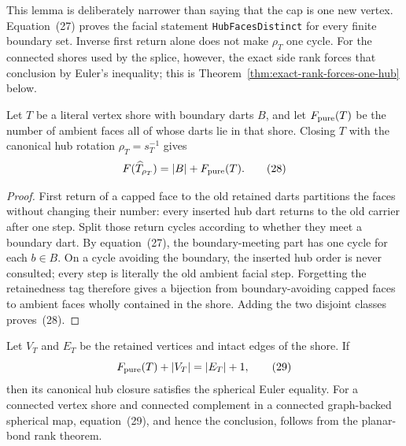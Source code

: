 This lemma is deliberately narrower than saying that the cap is one new
vertex.  Equation~(27) proves the facial statement
\texttt{HubFacesDistinct} for every finite boundary set.  Inverse first
return alone does not make \(\rho_T\) one cycle.  For the connected shores
used by the splice, however, the exact side rank forces that conclusion by
Euler's inequality; this is Theorem~\ref{thm:exact-rank-forces-one-hub} below.

\begin{theorem}
\label{thm:canonical-hub-face-count}
Let \(T\) be a literal vertex shore with boundary darts \(B\), and let
\(F_{\rm pure}(T)\) be the number of ambient faces all of whose darts lie in
that shore.  Closing \(T\) with the canonical hub rotation
\(\rho_T=s_T^{-1}\) gives
\[
       F(\widehat T_{\rho_T})=|B|+F_{\rm pure}(T).       \tag{28}
\]
\end{theorem}

\begin{proof}
First return of a capped face to the old retained darts partitions the faces
without changing their number: every inserted hub dart returns to the old
carrier after one step.  Split those return cycles according to whether they
meet a boundary dart.  By equation~(27), the boundary-meeting part has one
cycle for each \(b\in B\).  On a cycle avoiding the boundary, the inserted
hub order is never consulted; every step is literally the old ambient facial
step.  Forgetting the retainedness tag therefore gives a bijection from
boundary-avoiding capped faces to ambient faces wholly contained in the
shore.  Adding the two disjoint classes proves~(28).
\end{proof}

\begin{corollary}
\label{cor:canonical-hub-spherical}
Let \(V_T\) and \(E_T\) be the retained vertices and intact edges of the
shore.  If
\[
       F_{\rm pure}(T)+|V_T|=|E_T|+1,                 \tag{29}
\]
then its canonical hub closure satisfies the spherical Euler equality.
For a connected vertex shore and connected complement in a connected
graph-backed spherical map, equation~(29), and hence the conclusion, follows
from the planar-bond rank theorem.
\end{corollary}

